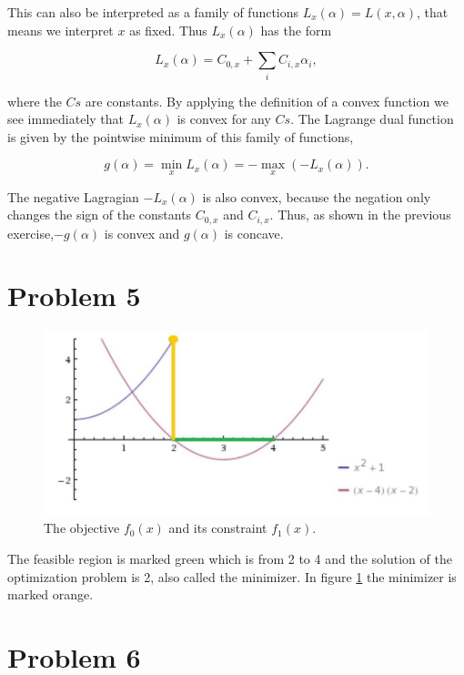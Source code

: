 \documentclass[12pt]{article}
\begin{document}
This can also be interpreted as a family of functions $L_x(\alpha) = L(x,\alpha)$, that means we interpret $x$ as fixed. Thus $L_x(\alpha)$ has the form

\begin{equation}
L_x(\alpha) = C_{0,x} + \sum_{i}{C_{i,x} \alpha_i},
\end{equation}

where the $Cs$ are constants. By applying the definition of a convex function we see immediately that $L_x(\alpha)$ is convex for any $Cs$.
The Lagrange dual function is given by the pointwise minimum of this family of functions,

\begin{equation}
g(\alpha) = \min\limits_{x}L_x(\alpha) = -\max\limits_{x}(-L_x(\alpha)).
\end{equation}

The negative Lagragian $-L_x(\alpha)$ is also convex, because the negation only changes the sign of the
constants $C_{0,x}$ and $C_{i,x}$. Thus, as shown in the previous exercise,$-g(\alpha)$ is convex and $g(\alpha)$ is concave.

\section*{Problem 5}

\begin{figure}[ht]
\includegraphics[width=\textwidth]{ex5.jpg}
\caption{The objective $f_0(x)$ and its constraint $f_1(x)$.}
\label{optimizationprob}
\end{figure}

The feasible region is marked green which is from 2 to 4 and the solution of the optimization problem is 2, also called the minimizer. In figure \ref{optimizationprob} the minimizer is marked orange.

\section*{Problem 6}
\end{document}
